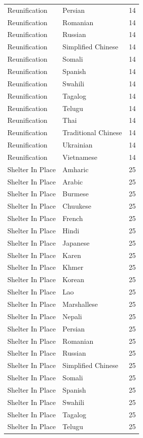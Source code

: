 \begin{longtable}{p{3cm} p{3cm} r}
Reunification & Persian & 14 \\
Reunification & Romanian & 14 \\
Reunification & Russian & 14 \\
Reunification & Simplified Chinese & 14 \\
Reunification & Somali & 14 \\
Reunification & Spanish & 14 \\
Reunification & Swahili & 14 \\
Reunification & Tagalog & 14 \\
Reunification & Telugu & 14 \\
Reunification & Thai & 14 \\
Reunification & Traditional Chinese & 14 \\
Reunification & Ukrainian & 14 \\
Reunification & Vietnamese & 14 \\
Shelter In Place & Amharic & 25 \\
Shelter In Place & Arabic & 25 \\
Shelter In Place & Burmese & 25 \\
Shelter In Place & Chuukese & 25 \\
Shelter In Place & French & 25 \\
Shelter In Place & Hindi & 25 \\
Shelter In Place & Japanese & 25 \\
Shelter In Place & Karen & 25 \\
Shelter In Place & Khmer & 25 \\
Shelter In Place & Korean & 25 \\
Shelter In Place & Lao & 25 \\
Shelter In Place & Marshallese & 25 \\
Shelter In Place & Nepali & 25 \\
Shelter In Place & Persian & 25 \\
Shelter In Place & Romanian & 25 \\
Shelter In Place & Russian & 25 \\
Shelter In Place & Simplified Chinese & 25 \\
Shelter In Place & Somali & 25 \\
Shelter In Place & Spanish & 25 \\
Shelter In Place & Swahili & 25 \\
Shelter In Place & Tagalog & 25 \\
Shelter In Place & Telugu & 25 \\

\end{longtable}
